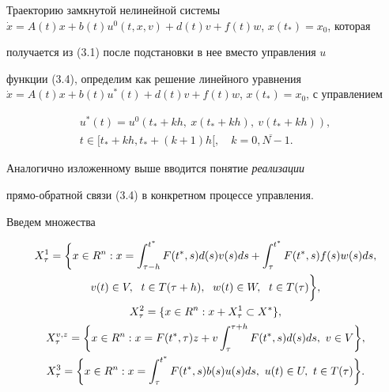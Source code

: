 Траекторию замкнутой нелинейной системы $\Dot


x=A(t)x+b(t)u^0(t,x,v)+d(t)v+f(t)w$, $x(t_{*})=x_{0}$, которая


получается из (3.1) после подстановки в нее вместо управления $u$


функции (3.4), определим как решение линейного уравнения $\Dot x


=A(t)x+b(t)u^*(t)+d(t)v+f(t)w$, $x(t_{*})=x_{0}$, с управлением


\begin{gather*}


u^*(t)=u^0(t_{*}+kh,\ x(t_*+kh),\ v(t_*+kh)),\\


t \in [t_{*}+kh,t_{*}+(k+1)h[,\quad k =\overline{0,N-1}.


\end{gather*}





Аналогично изложенному выше вводится понятие {\it реализации}


прямо-обратной связи (3.4) в конкретном процессе управления.





Введем множества


\begin{gather}


X_{\tau}^{1}=\bigg\{x \in R^n: x =


\int_{\tau-h}^{t^*}F(t^*,s)d(s)v(s)ds+


\int_{\tau}^{t^*}F(t^*,s)f(s)w(s)ds, \notag \\


%


v(t) \in V,\ \; t \in T(\tau+h),\ \; w(t) \in W,


\ \;t \in T(\tau) \bigg\},\notag \\


%


X_{\tau}^{2}=\{x \in R^n:x+X_{\tau}^1 \subset X^*\},\notag \\


%


X^{v,z}_{\tau}=\bigg\{x \in


R^n:x=F(t^*,\tau)z+v\int_{\tau}^{\tau+h}F(t^*,s)d(s)ds,\ v \in V


\bigg\}, \\


%


X_{\tau}^3=\bigg\{x \in R^n:x=\int_{\tau}^{t^*}F(t^*,s)b(s)u(s)ds,


\ u(t) \in U,\ t \in T(\tau) \bigg\}.\notag


\end{gather}





